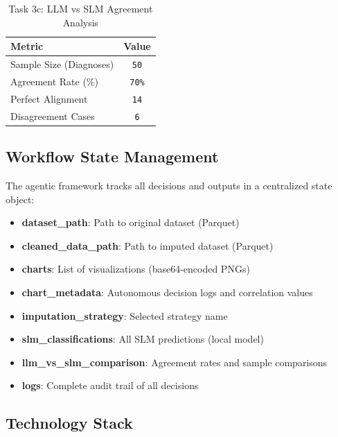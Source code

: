 \documentclass[10pt,a4paper]{article}
\begin{document}
\begin{table}[H]  %
    \centering
    \caption{Task 3c: LLM vs SLM Agreement Analysis}
    \begin{tabular}{|l|c|}
        \hline
        \textbf{Metric} & \textbf{Value} \\
        \hline
        Sample Size (Diagnoses) & \texttt{50} \\
        Agreement Rate (\%) & \texttt{70\%} \\
        Perfect Alignment & \texttt{14} \\
        Disagreement Cases & \texttt{6} \\
        \hline
    \end{tabular}
\end{table}


\subsection{Workflow State Management}

The agentic framework tracks all decisions and outputs in a centralized state object:

\begin{itemize}
    \item \textbf{dataset\_path}: Path to original dataset (Parquet)
    \item \textbf{cleaned\_data\_path}: Path to imputed dataset (Parquet)
    \item \textbf{charts}: List of visualizations (base64-encoded PNGs)
    \item \textbf{chart\_metadata}: Autonomous decision logs and correlation values
    \item \textbf{imputation\_strategy}: Selected strategy name
    \item \textbf{slm\_classifications}: All SLM predictions (local model)
    \item \textbf{llm\_vs\_slm\_comparison}: Agreement rates and sample comparisons
    \item \textbf{logs}: Complete audit trail of all decisions
\end{itemize}

\subsection{Technology Stack}
\end{document}

